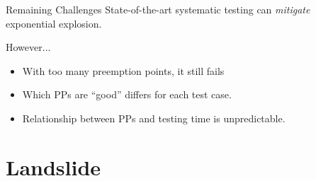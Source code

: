 \documentclass[xcolor=dvipsnames]{beamer}
\begin{document}
\begin{frame}{Remaining Challenges}
	State-of-the-art systematic testing can {\em mitigate} exponential explosion.
	\linegap

	However...
	\begin{itemize}
		\item With too many preemption points, it still fails
		\item Which PPs are ``good'' differs for each test case.
		\item Relationship between PPs and testing time is unpredictable.
	\end{itemize}

\end{frame}


\section{Landslide}

\end{document}
